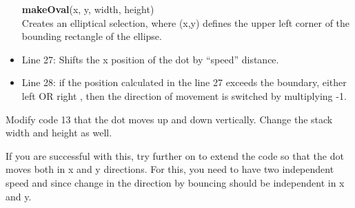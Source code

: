 \begin{itemize}
\begin{indentCom}
\textbf{makeOval}(x, y, width, height)\\
Creates an elliptical selection, where (x,y) defines the upper left corner of the bounding rectangle of the ellipse. 
\end{indentCom}
\item Line 27: Shifts the x position of the dot by ``speed'' distance. 
\item Line 28: if the position calculated in the line 27 exceeds the boundary, either left  OR right , then the direction of movement is switched by multiplying -1.
\end{itemize}
\begin{indentexercise}{2}
Modify code 13 that the dot moves up and down vertically. Change the stack width and height as well. 

If you are successful with this, try further on to extend the code so that the dot moves both in x and y directions. For this, you need to have two independent speed  and  since change in the direction by bouncing should be independent in x and y. 
\end{indentexercise}
